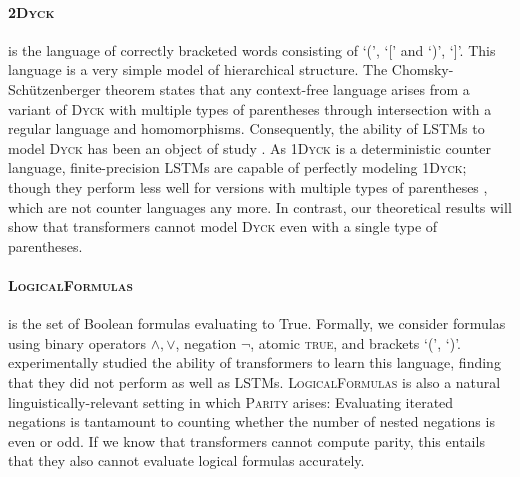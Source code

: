 \documentclass[11pt,a4paper]{article}
\newcounter{theorem}
\begin{document}
\paragraph{\textsc{2Dyck}} is the language of correctly bracketed words consisting of `(', `[' and `)', `]'.
This language is a very simple model of hierarchical structure.
The Chomsky-Sch{\"u}tzenberger theorem states that any context-free language arises from a variant of \textsc{Dyck} with multiple types of parentheses through intersection with a regular language and homomorphisms.
Consequently, the ability of LSTMs to model \textsc{Dyck} has been an object of study \cite{sennhauser2018evaluating,bernardy2018can}.
As \textsc{1Dyck} is a deterministic counter language, finite-precision LSTMs are capable of perfectly modeling \textsc{1Dyck}; though they perform less well for versions with multiple types of parentheses \cite{sennhauser2018evaluating}, which are not counter languages any more.
In contrast, our theoretical results will show that transformers cannot model \textsc{Dyck} even with a single type of parentheses.


\paragraph{\textsc{LogicalFormulas}} is the set of Boolean formulas evaluating to True. Formally, we consider formulas using binary operators $\wedge, \vee$, negation $\neg$, atomic \textsc{true}, and brackets `(', `)'.
\cite{tran2018importance} experimentally studied the ability of transformers to learn this language, finding that they did not perform as well as LSTMs.
\textsc{LogicalFormulas} is also a natural linguistically-relevant setting in which \textsc{Parity} arises: Evaluating iterated negations is tantamount to counting whether the number of nested negations is even or odd.
If we know that transformers cannot compute parity, this entails that they also cannot evaluate logical formulas accurately.

\end{document}
